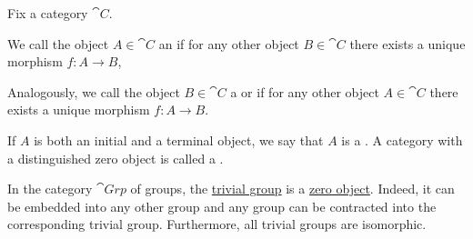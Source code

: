 \begin{definition}\label{def:zero_objects}
  Fix a category \( \cat{C} \).

  \begin{thmenum}
     We call the object \( A \in \cat{C} \) an  if for any other object \( B \in \cat{C} \) there exists a unique morphism \( f: A \to B \),

     Analogously, we call the object \( B \in \cat{C} \) a  or  if for any other object \( A \in \cat{C} \) there exists a unique morphism \( f: A \to B \).

     If \( A \) is both an initial and a terminal object, we say that \( A \) is a . A category with a distinguished zero object is called a .
  \end{thmenum}
\end{definition}

\begin{example}\label{ex:def:zero_objects}
  In the category \hyperref[def:group/category]{\( \cat{Grp} \)} of groups, the \hyperref[def:group/trivial]{trivial group} is a \hyperref[def:zero_objects/zero]{zero object}. Indeed, it can be embedded into any other group and any group can be contracted into the corresponding trivial group. Furthermore, all trivial groups are isomorphic.
\end{example}

